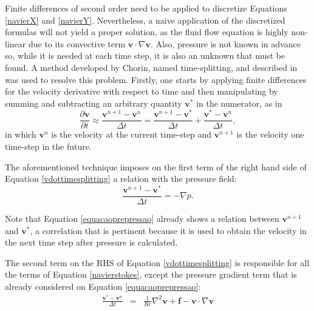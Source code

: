 \documentclass[journal]{IEEEtran}
\begin{document}
Finite differences of second order need to be applied to discretize Equations \ref{navierX} and \ref{navierY}. Nevertheless, a naive application of the discretized formulas will not yield a proper solution, as the fluid flow equation is highly non-linear due to its convective term $\mathbf{v}\cdot \nabla \mathbf{v}$. Also, pressure is not known in advance so, while it is needed at each time step, it is also an unknown that must be found. A method developed by Chorin, named time-splitting, and described in \cite{Chorin1997118} was used to resolve this problem. Firstly, one starts by applying finite differences for the velocity derivative with respect to time and then manipulating by summing and subtracting an arbitrary quantity $\mathbf{v}^*$ in the numerator, as in \begin{equation}
\frac{\partial \textbf{v}}{\partial t}\approx \frac{\textbf{v}^{n+1}-\textbf{v}^n}{\Delta t}=\frac{\textbf{v}^{n+1}-\textbf{v}^*}{\Delta t}+\frac{\textbf{v}^{*}-\textbf{v}^n}{\Delta t}, \label{vdottimesplitting}
\end{equation} in which $\mathbf{v}^n$ is the velocity at the current time-step and $\mathbf{v}^{n+1}$ is the velocity one time-step in the future.

The aforementioned technique imposes on the first term of the right hand side of Equation \ref{vdottimesplitting} a relation with the pressure field: 
\begin{equation}\frac{\textbf{v}^{n+1}-\textbf{v}^*}{\Delta t}=-\nabla p\label{equacaoprepressao}.\end{equation}

Note that Equation \ref{equacaoprepressao} already shows a relation between $\mathbf{v}^{n+1}$ and $\mathbf{v}^{*}$, a correlation that is pertinent because it is used to obtain the velocity in the next time step after pressure is calculated.


The second term on the RHS of Equation \ref{vdottimesplitting} is responsible for all the terms of Equation \ref{navierstokes}, except the pressure gradient term that is already considered on Equation \ref{equacaoprepressao}: \begin{eqnarray}
\frac{\textbf{v}^{*}-\textbf{v}^n}{\Delta t}&=& \frac{1}{\mathit{Re}}\nabla ^2 \textbf{v} + \textbf{f} - \textbf{v}\cdot \nabla \textbf{v}\label{equacaovestrela}
\end{eqnarray}
\end{document}

